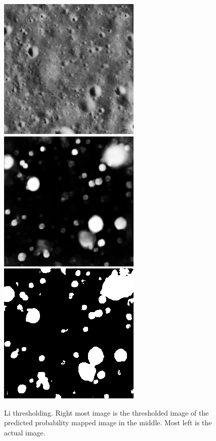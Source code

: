 \documentclass[11pt]{article}
\begin{document}
\begin{figure}[H]
	\includegraphics[width=.3\textwidth]{files/results/26.png}\hfill	
	\includegraphics[width=.3\textwidth]{files/results/26_predict.png}\hfill
	\includegraphics[width=.3\textwidth]{files/results/li.png}\hfill
	\caption{Li thresholding. Right most image is the thresholded image of the predicted probability mapped image in the middle. Most left is the actual image.}
	\label{Li thresholding}
\end{figure}
\end{document}
